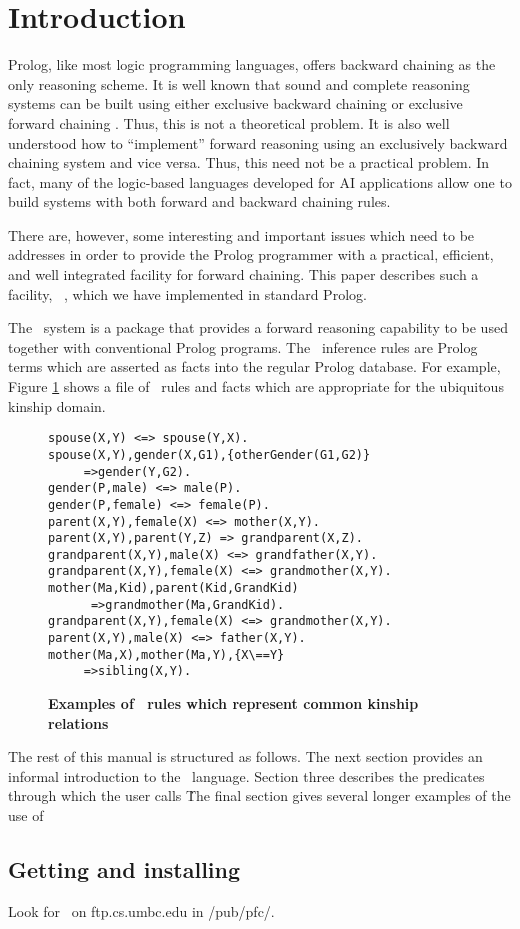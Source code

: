 \section{Introduction}

Prolog, like most logic programming languages, offers backward
chaining as the only reasoning scheme.  It is well known that sound
and complete reasoning systems can be built using either exclusive
backward chaining or exclusive forward chaining \cite{Nilsson80}.
Thus, this is not a theoretical problem.  It is also well understood
how to ``implement'' forward reasoning using an exclusively backward
chaining system and vice versa.  Thus, this need not be a practical
problem.  In fact, many of the logic-based languages developed for AI
applications \cite{DUCK,MRS,Petrie88,Fritzson88a} allow one to build
systems with both forward and backward chaining rules.

There are, however, some interesting and important issues which need
to be addresses in order to provide the Prolog programmer with a
practical, efficient, and well integrated facility for forward
chaining.  This paper describes such a facility, \pfc\ , which we have
implemented in standard Prolog.

The \pfc\ system is a package that provides a forward reasoning
capability to be used together with conventional Prolog programs.  The
\pfc\ inference rules are Prolog terms which are asserted as facts
into the regular Prolog database.  For example, Figure
\ref{fig:pfcrules} shows a file of \pfc\ rules and facts which are
appropriate for the ubiquitous kinship domain.

\begin{figure}[bhp]
\figline
\small
\begin{verbatim}
spouse(X,Y) <=> spouse(Y,X).
spouse(X,Y),gender(X,G1),{otherGender(G1,G2)}
     =>gender(Y,G2).
gender(P,male) <=> male(P).
gender(P,female) <=> female(P).
parent(X,Y),female(X) <=> mother(X,Y).
parent(X,Y),parent(Y,Z) => grandparent(X,Z).
grandparent(X,Y),male(X) <=> grandfather(X,Y).
grandparent(X,Y),female(X) <=> grandmother(X,Y).
mother(Ma,Kid),parent(Kid,GrandKid)
      =>grandmother(Ma,GrandKid).
grandparent(X,Y),female(X) <=> grandmother(X,Y).
parent(X,Y),male(X) <=> father(X,Y).
mother(Ma,X),mother(Ma,Y),{X\==Y}
     =>sibling(X,Y).
\end{verbatim}
\caption[Pfc Rules]{{\bf Examples of \pfc\ rules which represent common kinship relations}}
\label{fig:pfcrules}
\figline
\end{figure}



The rest of this manual is structured as follows.  The next section
provides an informal introduction to the \pfc\ language.  Section
three describes the predicates through which the user calls \pfc\.
The final section gives several longer examples of the use of \pfc\

\subsection*{Getting and installing \pfc\ }

Look for \pfc\ on ftp.cs.umbc.edu in /pub/pfc/.

